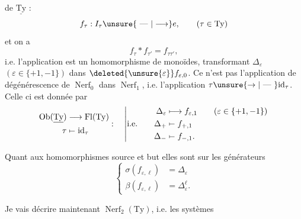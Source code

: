 

de $\underline{\mathrm{Ty}}$ :
\[
f_\tau:I_\tau\unsure{\text{ --- }|\longrightarrow}e,\qquad(\tau\in\mathrm{Ty})
\]
et on a
\[
f_\tau*f_{\tau'}=f_{\tau\tau'},
\]
i.e.  l'application
est un homomorphisme de monoïdes, transformant $\Delta_\varepsilon$ $(\varepsilon\in\{+1,-1\})$ dans $\deleted{\unsure{\varepsilon}} f_{\varepsilon,0}$.   Ce n'est pas l'application de dégénérescence de $\operatorname{Nerf}_0$ dans $\operatorname{Nerf}_1$, i.e. l'application $\tau\unsure{\rightarrow|\text{ --- }}\mathrm{id}_\tau$. Celle ci est donnée par
\[
\begin{aligned}
 \operatorname{Ob}(\underline{\mathrm{Ty}})&\longrightarrow \operatorname{Fl}(\mathrm{Ty})\\
 \tau&\mathrel{\mapstochar\relbar}\mathrm{id}_\tau
\end{aligned}
:\quad
\left|\begin{aligned}
\Delta_\varepsilon&\longmapsto f_{\varepsilon,1}\qquad(\varepsilon\in\{+1,-1\})\\
\text{i.e.}\qquad \Delta_+&\mathrel{\mapstochar\relbar} f_{+,1}\\
\Delta_-&\mathrel{\mapstochar\relbar} f_{-,1}.
\end{aligned}\right.
\]

Quant aux homomorphismes source et but
elles sont  sur les générateurs
\[
\left\{\begin{aligned}
\sigma(f_{\varepsilon,\ell})&=\Delta_\varepsilon\\
\beta(f_{\varepsilon,\ell})&=\Delta_\varepsilon^\ell.
\end{aligned}\right.
\]

Je vais décrire maintenant $\operatorname{Nerf}_2(\mathrm{Ty})$, i.e. les  systèmes
